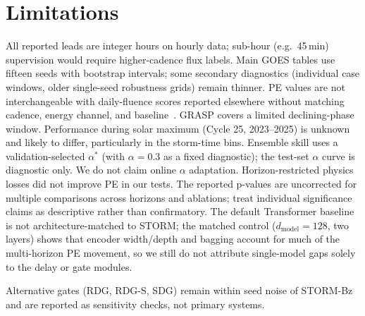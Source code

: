 \documentclass{ieeeaccess}
\begin{document}
\section{Limitations}
\label{sec:limits}
All reported leads are integer hours on hourly data; sub-hour (e.g.\ 45\,min) supervision would require higher-cadence flux labels.
Main GOES tables use fifteen seeds with bootstrap intervals; some
secondary diagnostics (individual case windows, older single-seed
robustness grids) remain thinner. PE values are not interchangeable with
daily-fluence scores reported elsewhere without matching cadence, energy
channel, and baseline~\cite{b21,b22}. GRASP covers a limited declining-phase
window. Performance during solar maximum (Cycle 25, 2023--2025) is unknown and likely to differ, particularly in the storm-time bins. Ensemble skill uses a validation-selected \(\alpha^*\) (with \(\alpha=0.3\) as a fixed diagnostic); the test-set \(\alpha\) curve is diagnostic only.
We do not claim online \(\alpha\) adaptation. Horizon-restricted
physics losses did not improve PE in our tests. The reported p-values are uncorrected for multiple comparisons across horizons and ablations; treat individual significance claims as descriptive rather than confirmatory.
The default Transformer baseline is not architecture-matched to STORM; the matched
control (\(d_{\mathrm{model}}=128\), two layers) shows that encoder width/depth and bagging
account for much of the multi-horizon PE movement, so we still do not attribute
single-model gaps solely to the delay or gate modules.

Alternative gates (RDG, RDG-S, SDG) remain within seed noise of STORM-Bz and are reported as sensitivity checks, not primary systems.
\end{document}
